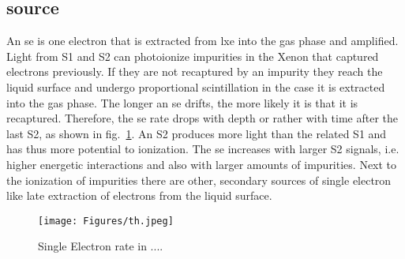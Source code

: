 
\FloatBarrier
\subsection{source}
\label{ssec:source}
\FloatBarrier


An \gls{se} is one electron that is extracted from \gls{lxe} into the gas phase and amplified.
Light from S1 and S2 can photoionize impurities in the Xenon that captured electrons previously.
If they are not recaptured by an impurity they reach the liquid surface and undergo proportional scintillation in the case it is extracted into the gas phase.
The longer an \gls{se} drifts, the more likely it is that it is recaptured.
Therefore, the \gls{se} rate drops with depth or rather with time after the last S2, as shown in fig.~\ref{fig:se-rate}.  %
An S2 produces more light than the related S1 and has thus more potential to ionization.
The \gls{se} increases with larger S2 signals, i.e. higher energetic interactions and also with larger amounts of impurities\cite{}.  %
Next to the ionization of impurities there are other, secondary sources of single electron like late extraction of electrons from the liquid surface.


\begin{figure}
    \centering
    \texttt{[image: Figures/th.jpeg]}  %
    \caption[Single Electron Rate in 1T/100/LUX]{
        Single Electron rate in ...\cite{}.
    }
    \label{fig:se-rate}
\end{figure}





